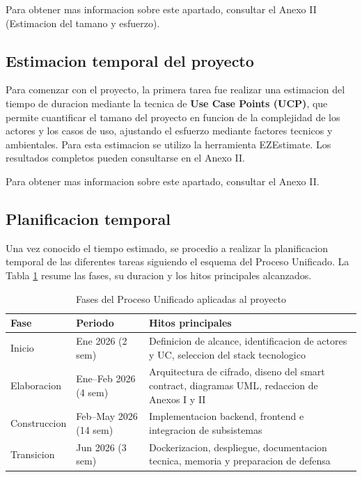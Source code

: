 \documentclass[11pt, a4paper]{article}
\begin{document}
Para obtener mas informacion sobre este apartado, consultar el Anexo II (Estimacion del tamano y esfuerzo).

\subsection{Estimacion temporal del proyecto}

Para comenzar con el proyecto, la primera tarea fue realizar una estimacion del tiempo de duracion mediante la tecnica de \textbf{Use Case Points (UCP)}, que permite cuantificar el tamano del proyecto en funcion de la complejidad de los actores y los casos de uso, ajustando el esfuerzo mediante factores tecnicos y ambientales. Para esta estimacion se utilizo la herramienta EZEstimate. Los resultados completos pueden consultarse en el Anexo II.

Para obtener mas informacion sobre este apartado, consultar el Anexo II.

\subsection{Planificacion temporal}

Una vez conocido el tiempo estimado, se procedio a realizar la planificacion temporal de las diferentes tareas siguiendo el esquema del Proceso Unificado. La Tabla \ref{tab:fases-up} resume las fases, su duracion y los hitos principales alcanzados.

\begin{table}[H]
\centering
\renewcommand{\arraystretch}{1.3}
\small
\begin{tabular}{|p{3.5cm}|p{5cm}|p{4cm}|}
\hline
\textbf{Fase} & \textbf{Periodo} & \textbf{Hitos principales} \\
\hline
Inicio & Ene 2026 (2 sem) & Definicion de alcance, identificacion de actores y UC, seleccion del stack tecnologico \\
\hline
Elaboracion & Ene--Feb 2026 (4 sem) & Arquitectura de cifrado, diseno del smart contract, diagramas UML, redaccion de Anexos I y II \\
\hline
Construccion & Feb--May 2026 (14 sem) & Implementacion backend, frontend e integracion de subsistemas \\
\hline
Transicion & Jun 2026 (3 sem) & Dockerizacion, despliegue, documentacion tecnica, memoria y preparacion de defensa \\
\hline
\end{tabular}
\caption{Fases del Proceso Unificado aplicadas al proyecto}
\label{tab:fases-up}
\end{table}
\end{document}
